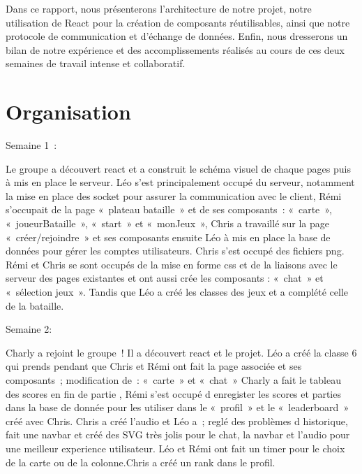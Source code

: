 \documentclass[a4paper]{article}
\begin{document}
Dans ce rapport, nous présenterons l'architecture de notre projet, notre utilisation de React pour la création de composants réutilisables, ainsi que notre protocole de communication et d'échange de données. Enfin, nous dresserons un bilan de notre expérience et des accomplissements réalisés au cours de ces deux semaines de travail intense et collaboratif.


\section{Organisation}
Semaine 1 :

Le groupe a découvert react et a construit le schéma visuel de chaque pages 
puis à mis en place le serveur. 
	Léo s'est principalement occupé du serveur, notamment la mise en place des socket pour assurer la communication avec le client, Rémi s'occupait de la page « plateau bataille » et de ses composants : « carte », « joueurBataille », « start » et « monJeux », Chris a travaillé sur la page « créer/rejoindre » et ses composants ensuite Léo à mis en place la base de données pour gérer les comptes utilisateurs. Chris s'est occupé des fichiers png. Rémi et Chris se sont occupés de la mise en forme css et de la liaisons avec le serveur des pages existantes et ont aussi crée les composants : « chat » et « sélection jeux ». Tandis que Léo a créé les classes des jeux et a complété celle de la bataille.

Semaine 2:

	Charly a rejoint le groupe ! Il a découvert react et le projet.
Léo a créé la classe 6 qui prends pendant que Chris et Rémi ont fait la page associée et ses composants ; modification de : « carte » et  « chat »
	Charly a fait le tableau des scores en fin de partie , Rémi s’est occupé d enregister les scores et parties dans la base de donnée pour les utiliser dans le « profil » et le « leaderboard » créé avec Chris. Chris a créé l’audio et Léo a ; reglé des problèmes d historique, fait une navbar et créé des SVG très jolis pour le chat, la navbar et l'audio pour une meilleur experience utilisateur. 
Léo et Rémi ont fait un timer pour le choix de la carte ou de la colonne.Chris a créé un rank dans le profil.

\newpage
{}
\end{document}
